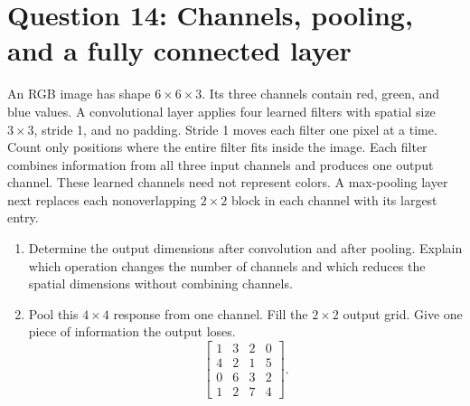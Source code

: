 \documentclass[11pt]{article}
\newenvironment{studentanswer}[1]
  {\par\medskip\noindent
   \begin{tcolorbox}[height from=#1 to 100cm, colback=white, colframe=gray!60,
     boxrule=0.6pt, arc=0pt, outer arc=0pt, left=7pt, right=7pt,
     top=7pt, bottom=7pt, title={Answer / work}, fonttitle=\small,
     coltitle=black, colbacktitle=gray!8, titlerule=0pt]
   \ignorespaces}
  {\end{tcolorbox}\par}
\begin{document}
\section*{Question 14: Channels, pooling, and a fully connected layer}
An RGB image has shape $6\times6\times3$. Its three channels contain
red, green, and blue values. A convolutional layer applies four learned
filters with spatial size $3\times3$, stride 1, and no padding.
Stride 1 moves each filter one pixel at a time. Count only positions
where the entire filter fits inside the image.
Each filter combines information from all three input channels and
produces one output channel. These learned channels need not represent
colors. A max-pooling layer next replaces each nonoverlapping
$2\times2$ block in each channel with its largest entry.
\begin{enumerate}[label=(\alph*)]
\item \begin{minipage}[t]{\linewidth} Determine the output dimensions after convolution and after
pooling. Explain which operation changes the number of channels and
which reduces the spatial dimensions without combining channels.

\begin{studentanswer}{4cm}
\end{studentanswer}

\end{minipage}

\item \begin{minipage}[t]{\linewidth} Pool this $4\times4$ response from one channel. Fill the
$2\times2$ output grid. Give one piece of information the output loses.
\[
\begin{bmatrix}1&3&2&0\\4&2&1&5\\0&6&3&2\\1&2&7&4\end{bmatrix}.
\]

\begin{studentanswer}{4cm}
\begin{center}\end{center}
\end{studentanswer}

\end{minipage}
\end{enumerate}
\end{document}
